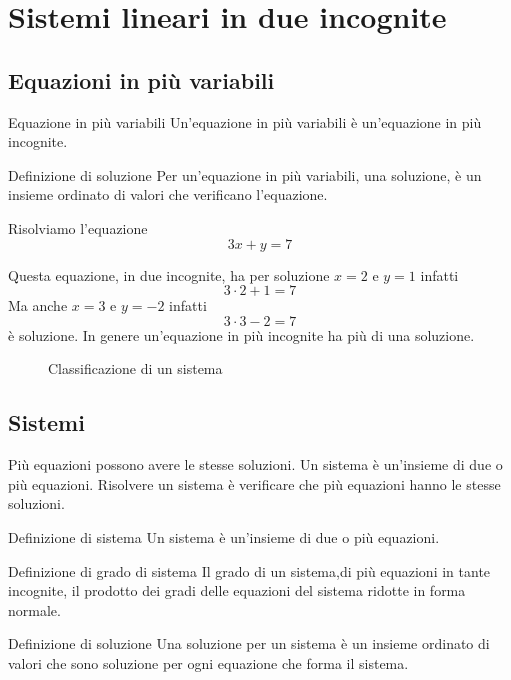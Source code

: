 \chapter{Sistemi lineari in due incognite}
\label{sec:sistemiLineariInDueIncognite}
\section{Equazioni in più variabili}
\label{sec:EquazioniInPiuVariabili}
\begin{definizionet}{Equazione in più variabili}{}
	Un'equazione in più variabili è un'equazione in più incognite.
\end{definizionet}
\begin{definizionet}{Definizione di soluzione}{}
Per un'equazione in più variabili, una soluzione, è un insieme ordinato di valori che verificano l'equazione.
\end{definizionet}
\begin{esempiot}{}{}
	Risolviamo l'equazione\[ 3x+y=7\]
\end{esempiot}	
Questa equazione, in due incognite, ha per soluzione
$x=2$ e $y=1$ infatti \[3\cdot2+1=7\]
Ma anche $x=3$ e $y=-2$ infatti \[3\cdot3-2=7\] è soluzione.
In genere un'equazione in più incognite ha più di una soluzione.
\begin{figure}
	\centering

	\caption{Classificazione di un sistema}
	\label{fig:ClassificazioneDiUnSistema}
\end{figure}
\section{Sistemi}
\label{sec:Sistemi}
Più  equazioni  possono avere le stesse soluzioni. Un sistema è un'insieme di due o più equazioni. Risolvere un sistema è verificare che più equazioni hanno le stesse soluzioni.
\begin{definizionet}{Definizione di sistema}{}
Un sistema è un'insieme di due o più  equazioni.
\end{definizionet}
\begin{definizionet}{Definizione di grado di sistema}{}\label{def:sistemaGrado}
Il grado di un sistema,di più equazioni in tante incognite,  il prodotto dei gradi delle equazioni del sistema ridotte in forma normale.
\end{definizionet}
\begin{definizionet}{Definizione di soluzione}{}
Una soluzione per un sistema è un insieme ordinato di valori che sono soluzione per ogni equazione che forma il sistema.
\end{definizionet}
